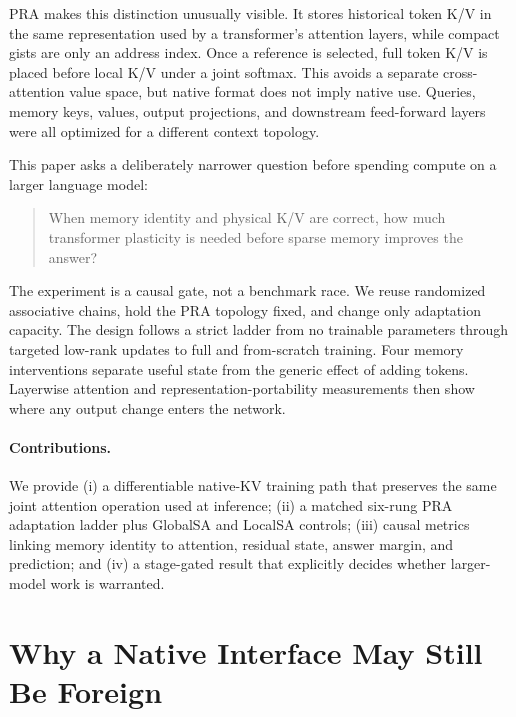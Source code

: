 \documentclass[11pt]{article}
\begin{document}
PRA makes this distinction unusually visible. It stores historical token K/V in
the same representation used by a transformer's attention layers, while compact
gists are only an address index. Once a reference is selected, full token K/V is
placed before local K/V under a joint softmax. This avoids a separate
cross-attention value space, but native format does not imply native use. Queries,
memory keys, values, output projections, and downstream feed-forward layers were
all optimized for a different context topology.

This paper asks a deliberately narrower question before spending compute on a
larger language model:

\begin{quote}
When memory identity and physical K/V are correct, how much transformer
plasticity is needed before sparse memory improves the answer?
\end{quote}

The experiment is a causal gate, not a benchmark race. We reuse randomized
associative chains, hold the PRA topology fixed, and change only adaptation
capacity. The design follows a strict ladder from no trainable parameters through
targeted low-rank updates \cite{hu2022lora} to full and from-scratch training.
Four memory interventions separate useful state from the generic effect of adding
tokens. Layerwise attention and representation-portability measurements then show
where any output change enters the network.

\paragraph{Contributions.}
We provide (i) a differentiable native-KV training path that preserves the same
joint attention operation used at inference; (ii) a matched six-rung PRA
adaptation ladder plus GlobalSA and LocalSA controls; (iii) causal metrics linking
memory identity to attention, residual state, answer margin, and prediction; and
(iv) a stage-gated result that explicitly decides whether larger-model work is
warranted.

\section{Why a Native Interface May Still Be Foreign}
\end{document}

